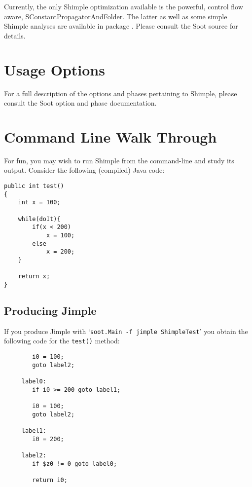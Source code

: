 \documentclass[10pt,letterpaper,oneside,onecolumn]{article}
\begin{document}
Currently, the only Shimple optimization available is the powerful,
control flow aware, SConstantPropagatorAndFolder.  The latter as well
as some simple Shimple analyses are available in package
.
Please consult the Soot source for details.

\section{Usage Options}

For a full description of the options and phases pertaining to
Shimple, please consult the
Soot option and phase documentation.

\section{Command Line Walk Through}

For fun, you may wish to run Shimple from the command-line and study
its output.  Consider the following (compiled) Java code:

\begin{verbatim}
public int test()
{
    int x = 100;
        
    while(doIt){
        if(x < 200)
            x = 100;
        else
            x = 200;
    }

    return x;
}
\end{verbatim}

\subsection{Producing Jimple}

If you produce Jimple with `{\tt soot.Main -f jimple ShimpleTest}' you
obtain the following code for the {\tt test()} method:

\begin{verbatim}
        i0 = 100;
        goto label2;

     label0:
        if i0 >= 200 goto label1;

        i0 = 100;
        goto label2;

     label1:
        i0 = 200;

     label2:
        if $z0 != 0 goto label0;

        return i0;
\end{verbatim}
\end{document}
